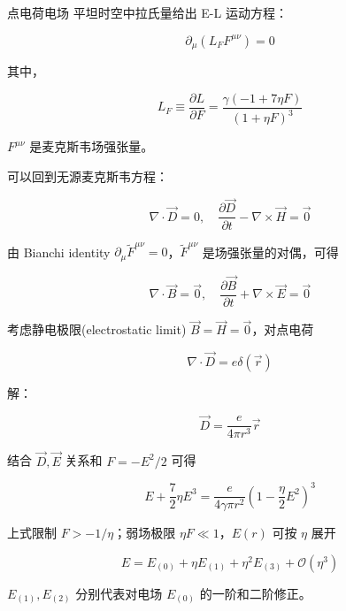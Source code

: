 \documentclass[9pt, dvipsnames]{beamer} %
\begin{document}
\begin{frame}{点电荷电场}
    平坦时空中拉氏量给出 E-L 运动方程：

    $$
    \partial_\mu\left(L_F F^{\mu\nu} \right) = 0
    $$
    
    其中，
    
    $$
    L_F
    \equiv \frac{\partial L }{\partial F } 
    =\frac{\gamma(-1+7\eta F) }{(1+\eta F)^3 }
    $$
    
    $F^{\mu \nu} $ 是麦克斯韦场强张量。

    可以回到无源麦克斯韦方程：

    $$
    \nabla\cdot\vec{D} = 0,\quad
    \frac{\partial \vec{D} }{\partial t } - \nabla\times\vec{H}= \vec{0} 
    $$
    
    由 Bianchi identity $\partial_\mu \tilde{F}^{\mu \nu}=0 $，$\tilde{F}^{\mu\nu} $ 是场强张量的对偶，可得
    
    $$
    \nabla\cdot\vec{B} = \vec{0},\quad 
    \frac{\partial \vec{B} }{\partial t } + \nabla\times\vec{E} = \vec{0} 
    $$    
\end{frame}

\begin{frame}
    考虑静电极限(electrostatic limit) $\vec{B}=\vec{H}=\vec{0} $，对点电荷

    $$
    \nabla\cdot\vec{D} = e\delta(\vec{r})
    $$
    
    解：
    
    $$
    \vec{D}
    =\frac{e }{4\pi r^3 } \vec{r}
    $$
    
    结合 $\vec{D},\vec{E} $ 关系和 $F=-E^2/2 $ 可得
    
    $$
    E+\frac{7 }{2 } \eta E^3
    =\frac{e }{4\gamma \pi r^2 } \left(1-\frac{\eta  }{2 } E^2 \right)^3 
    $$
    
    上式限制 $F>-1/\eta $；弱场极限 $\eta F\ll 1 $，$E(r) $ 可按 $\eta $ 展开
    
    $$
    E
    =E_{(0)} + \eta E_{(1)} + \eta^2 E_{(3)} + \mathcal{O}\left(\eta^3 \right)
    $$
    
    $E_{(1)},E_{(2)} $ 分别代表对电场 $E_{(0)} $ 的一阶和二阶修正。
\end{frame}
\end{document}
